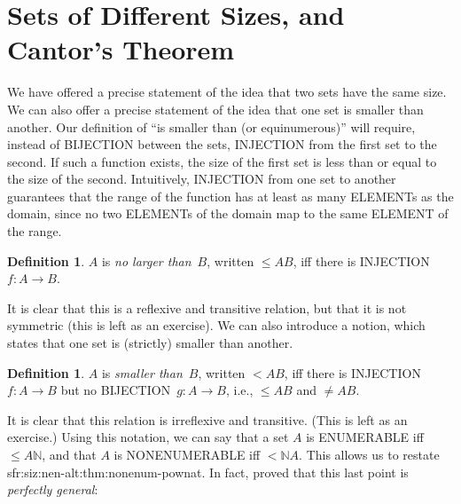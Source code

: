 \documentclass[10pt,a4paper]{article}
\makeatletter
\newcommand*{\olup}[1]{\MakeUppercase{#1}}
\theoremstyle{plain}
\theoremstyle{definition}
\newtheorem{defn}[thm]{Definition}
\theoremstyle{remark}
\newenvironment{explain}{}{}
\newcommand*{\olfileid}[3]{}
\newcommand*{\olsection}[1]{\section*{#1}}
\newcommand{\olref}{\@ifnextchar[{\olref@i}{\olref@final}}
\def\olref@i[#1]{\@ifnextchar[{\olref@ii}{\olref@final}}
\def\olref@ii[#1]{\@ifnextchar[{\olref@iii}{\olref@final}}
\def\olref@iii[#1]{\olref@final}
\def\olref@final#1{\ref{#1}}
\providecommand{\Nat}{\ensuremath{\mathbb{N}}}
\providecommand{\cardle}{\leq}
\providecommand{\PosInt}{\mathbb{Z}^{+}}
\providecommand{\Pow}{\mathcal{P}}
\providecommand{\oliflabeldef}[3]{#1}
\providecommand{\citet}[1]{\cite{#1}}
\providecommand{\cardneq}{\neq}
\providecommand{\cardless}{<}
\makeatother
\begin{document}



\olfileid{sfr}{siz}{car}

\olsection{Sets of Different Sizes, and Cantor's Theorem}

\begin{explain}
We have offered a precise statement of the idea that two sets have the
same size. We can also offer a precise statement of the idea that one
set is smaller than another. Our definition of ``is smaller than (or
equinumerous)'' will require, instead of \olup{bijection} between the
sets, \olup{injection} from the first set to the second. If such a
function exists, the size of the first set is less than or equal to
the size of the second. Intuitively, \olup{injection} from one set to
another guarantees that the range of the function has at least as many
\olup{element}s as the domain, since no two \olup{element}s of the domain
map to the same \olup{element} of the range.
\end{explain}

\begin{defn}
$A$ is \emph{no larger than}~$B$, written $\cardle{A}{B}$, iff there
is \olup{injection} $f \colon A \to B$.
\end{defn}

It is clear that this is a reflexive and transitive relation, but that
it is not symmetric (this is left as an exercise). We can also
introduce a notion, which states that one set is (strictly) smaller
than another. 

\begin{defn}
$A$ is \emph{smaller than}~$B$, written $\cardless{A}{B}$, iff there
is \olup{injection}~$f\colon A \to B$ but no \olup{bijection}~$g\colon A
\to B$, i.e., $\cardle{A}{B}$ and $\cardneq{A}{B}$.
\end{defn}

It is clear that this relation is irreflexive
and transitive. (This is left as an exercise.) Using this notation, we
can say that a set $A$ is \olup{enumerable} iff $\cardle{A}{\Nat}$, and
that $A$ is \olup{nonenumerable} iff $\cardless{\Nat}{A}$. This allows us
to restate
\oliflabeldef{sfr:siz:nen-alt:thm:nonenum-pownat}{%
\olref[sfr][siz][nen-alt]{thm:nonenum-pownat}
as the observation that
$\cardless{\Nat}{\Pow{\Nat}}$}{%
\olref[sfr][siz][nen]{thm:nonenum-pownat}
as the observation that $\cardless{\PosInt}{\Pow{\PosInt}}$}. In fact,
\citet{Cantor1892} proved that this last point is \emph{perfectly
general}:
\end{document}
